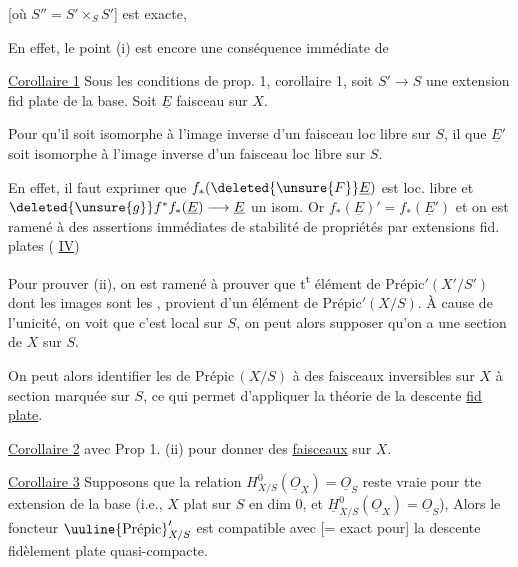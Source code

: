 [où $S''=S'\times_S S'$] est exacte, 

 En effet, le point (i) est encore une conséquence immédiate de

\uline{Corollaire 1} Sous les conditions de prop. 1,  corollaire 1, soit $S'\longrightarrow S$ une extension fid plate  de la base. Soit $\underline E$ faisceau  sur $X$.

Pour qu'il soit isomorphe à l'image inverse d'un faisceau loc libre  sur $S$, il  que $\underline E'$ soit isomorphe à l'image inverse d'un faisceau loc libre sur $S$.

En effet, il faut exprimer que $f_*(\deleted{\unsure{F}}\underline E)$ est loc. libre et $\deleted{\unsure{g}}f^*f_*(\underline E)\longrightarrow\underline E$ un isom. Or $f_*(\underline E)'=f_*(\underline E')$  et on est ramené à des assertions immédiates de stabilité de propriétés par extensions fid. plates ( \uline{IV})



Pour prouver (ii), on est ramené à prouver que t\textsuperscript{t} élément de $\mathrm{Prépic}'(X'/S')$ dont les images sont les , provient d'un élément de $\mathrm{Prépic}'(X/S)$. À cause de l'unicité, on voit que c'est local sur $S$, on peut alors supposer qu'on a une section de $X$ sur $S$.

On peut alors identifier les  de $\mathrm{Prépic}\,(X/S)$ à des faisceaux inversibles  sur $X$ à section marquée sur $S$, ce qui permet d'appliquer la théorie de la descente \uline{fid plate}.

\uline{Corollaire 2}   avec Prop 1. (ii) pour donner des \uline{faisceaux} sur $X$.

\uline{Corollaire \uline{3}} Supposons que la relation $H^0_{X/S}(\underline O_X)=\underline O_S$ reste vraie pour tte extension de la base (i.e., $X$  plat sur $S$ en dim 0, et $\underline H^0_{X/S}(\underline O_X)=\underline O_S$),  Alors le foncteur $\text{\uuline{Prépic}}'_{X/S}$ est compatible avec [= exact pour]  la descente fidèlement plate quasi-compacte.

